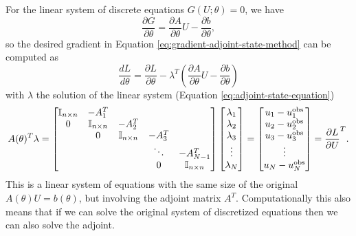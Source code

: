 For the linear system of discrete equations $G(U; \theta)=0$, we have \cite{Johnson}
\begin{equation}
    \frac{\partial G}{\partial \theta} 
    = 
    \frac{\partial A }{\partial \theta} U - \frac{\partial b}{\partial \theta},
\end{equation}
so the desired gradient in Equation \eqref{eq:gradient-adjoint-state-method} can be computed as 
\begin{equation}
    \frac{dL}{d\theta} 
    = 
    \frac{\partial L}{\partial \theta} 
    - 
    \lambda^T \left( \frac{\partial A }{\partial \theta} U - \frac{\partial b}{\partial \theta} \right)
    \label{eq:dhdtheta_linear}
\end{equation}
with $\lambda$ the solution of the linear system (Equation \eqref{eq:adjoint-state-equation})
\begin{equation}
    A(\theta)^T \lambda 
    =
    \begin{bmatrix}
        \operatorname{\mathbb{I}}_{n \times n} & -A_1^T &   &  & \\
        0 & \operatorname{\mathbb{I}}_{n \times n} & -A_2^T &  &  \\
          & 0 & \operatorname{\mathbb{I}}_{n \times n} & -A_3^T &  \\
         &  &   & \ddots & -A_{N-1}^T  \\
         &  &  & 0 & \operatorname{\mathbb{I}}_{n \times n}
    \end{bmatrix}
    \begin{bmatrix}
        \lambda_1 \\
        \lambda_2 \\
        \lambda_3 \\
        \vdots \\
        \lambda_N
    \end{bmatrix}
    = 
    \begin{bmatrix}
        u_1 - u_1^\text{obs} \\
        u_2 - u_2^\text{obs} \\
        u_3 - u_3^\text{obs} \\
        \vdots \\
        u_N - u_N^\text{obs}     
    \end{bmatrix}
    = 
    \frac{\partial L}{\partial U}^T.
    \label{eq:linea-adjoint-state-equation}
\end{equation}
This is a linear system of equations with the same size of the original $A(\theta) U = b(\theta)$, but involving the adjoint matrix $A^T$. 
Computationally this also means that if we can solve the original system of discretized equations then we can also solve the adjoint. 
